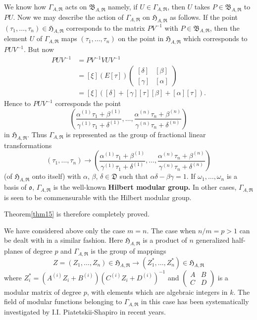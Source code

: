 We know how $\Gamma_{A,\mathfrak{R}}$ acts on
$\mathfrak{B}_{A,\mathfrak{R}}$ namely, if $U\in
\Gamma_{A,\mathfrak{R}}$, then $U$ takes
$P\in\mathfrak{B}_{A,\mathfrak{R}}$ to $PU$. Now we may describe the
action of $\Gamma_{A,\mathfrak{R}}$ on $\mathfrak{H}_{A,\mathfrak{R}}$
as follows. If the point
$(\tau_{1},\ldots,\tau_{n})\in\mathfrak{H}_{A,\mathfrak{R}}$
corresponds to the matrix $PV^{-1}$ with
$P\in\mathfrak{B}_{A,\mathfrak{R}}$, then the element $U$ of
$\Gamma_{A,\mathfrak{R}}$ maps $(\tau_{1},\ldots,\tau_{n})$ on the
point in $\mathfrak{H}_{A,\mathfrak{R}}$ which corresponds to
$PUV^{-1}$. But now
\begin{align*}
PUV^{-1} &= PV^{-1}VUV^{-1}\\
&= [\xi](E[\tau])
\begin{pmatrix}
[\delta] & [\beta]\\
[\gamma] & [\alpha]
\end{pmatrix}\\
&= [\xi]([\delta]+[\gamma][\tau][\beta]+[\alpha][\tau]).
\end{align*}
Hence to $PUV^{-1}$ corresponds the point
$$
\left(
\frac{\alpha^{(1)}\tau_{1}+\beta^{(1)}}{\gamma^{(1)}\tau_{1}+\delta^{(1)}},\ldots,\frac{\alpha^{(n)}\tau_{n}+\beta^{(n)}}{\gamma^{(n)}\tau_{n}+\delta^{(n)}}
\right)
$$
in $\mathfrak{H}_{A,\mathfrak{R}}$. Thus $\Gamma_{A,\mathfrak{R}}$ is
represented as the group of fractional linear transformations
$$
(\tau_{1},\ldots,\tau_{n})\to 
\left(
\frac{\alpha^{(1)}\tau_{1}+\beta^{(1)}}{\gamma^{(1)}\tau_{1}+\delta^{(1)}},\ldots,
\frac{\alpha^{(n)}\tau_{n}+\beta^{(n)}}{\gamma^{(n)}\tau_{n}+\delta^{(n)}}
\right)
$$
(of $\mathfrak{H}_{A,\mathfrak{R}}$ onto itself) with $\alpha$,
$\beta$, $\delta\in\mathfrak{D}$ such that
$\alpha\delta-\beta\gamma=1$. If $\omega_{1},\ldots,\omega_{n}$ is a
basis of $\mathfrak{o}$, $\Gamma_{A,\mathfrak{R}}$ is the well-known
{\bf Hilbert modular group.} In other cases, $\Gamma_{A,\mathfrak{R}}$
is seen to be commensurable with the Hilbert modular group.

Theorem\pageoriginale \ref{thm15} is therefore completely proved.

We have considered above only the case $m=n$. The case when $n/m=p>1$
can be dealt with in a similar fashion. Here
$\mathfrak{H}_{A,\mathfrak{R}}$ is a product of $n$ generalized
half-planes of degree $p$ and $\Gamma_{A,\mathfrak{R}}$ is the group
of mappings
$$
Z=(Z_{1},\ldots,Z_{n})\in\mathfrak{H}_{A,\mathfrak{R}}\to
(Z^{\ast}_{1},\ldots,Z^{\ast}_{n})\in\mathfrak{H}_{A,\mathfrak{R}}
$$
where $Z^{\ast}_{i}=(A^{(i)}Z_{i}+B^{(i)})(C^{(i)}Z_{i}+D^{(i)})^{-1}$
and $\left(\begin{smallmatrix} A & B\\ C & D
\end{smallmatrix}\right)$ is a modular matrix of degree $p$, with
elements which are algebraic integers in $k$. The field of modular
functions belonging to $\Gamma_{A,\mathfrak{R}}$ in this case has been
systematically investigated by I.I. Piatetskii-Shapiro in recent
years.


